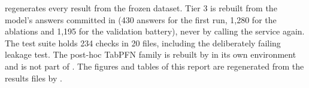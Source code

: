  regenerates every result from the frozen dataset. Tier 3 is rebuilt from the model's answers
committed in  (430 answers for the first run, 1,280 for the ablations and 1,195 for
the validation battery), never by calling the service again. The test suite holds 234 checks in 20 files, including
the deliberately failing leakage test. The post-hoc TabPFN family is rebuilt by  in its own
environment and is not part of . The figures and tables of this report are regenerated from the
results files by .
